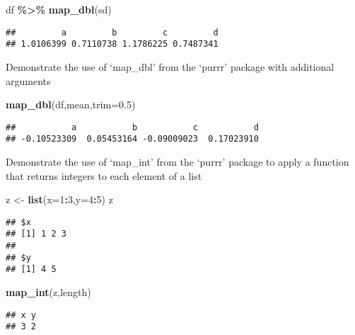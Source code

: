 \documentclass[
]{article}
\newenvironment{Shaded}{\begin{snugshade}}{\end{snugshade}}
\newcommand{\AttributeTok}[1]{\textcolor[rgb]{0.13,0.29,0.53}{#1}}
\newcommand{\DecValTok}[1]{\textcolor[rgb]{0.00,0.00,0.81}{#1}}
\newcommand{\FloatTok}[1]{\textcolor[rgb]{0.00,0.00,0.81}{#1}}
\newcommand{\FunctionTok}[1]{\textcolor[rgb]{0.13,0.29,0.53}{\textbf{#1}}}
\newcommand{\NormalTok}[1]{#1}
\newcommand{\OtherTok}[1]{\textcolor[rgb]{0.56,0.35,0.01}{#1}}
\newcommand{\SpecialCharTok}[1]{\textcolor[rgb]{0.81,0.36,0.00}{\textbf{#1}}}
\begin{document}
\begin{Shaded}
\begin{Highlighting}[]
\NormalTok{df }\SpecialCharTok{\%\textgreater{}\%} \FunctionTok{map\_dbl}\NormalTok{(sd)}
\end{Highlighting}
\end{Shaded}

\begin{verbatim}
##         a         b         c         d 
## 1.0106399 0.7110738 1.1786225 0.7487341
\end{verbatim}

Demonstrate the use of `map\_dbl' from the `purrr' package with
additional arguments

\begin{Shaded}
\begin{Highlighting}[]
\FunctionTok{map\_dbl}\NormalTok{(df,mean,}\AttributeTok{trim=}\FloatTok{0.5}\NormalTok{)}
\end{Highlighting}
\end{Shaded}

\begin{verbatim}
##           a           b           c           d 
## -0.10523309  0.05453164 -0.09009023  0.17023910
\end{verbatim}

Demonstrate the use of `map\_int' from the `purrr' package to apply a
function that returns integers to each element of a list

\begin{Shaded}
\begin{Highlighting}[]
\NormalTok{z }\OtherTok{\textless{}{-}} \FunctionTok{list}\NormalTok{(}\AttributeTok{x=}\DecValTok{1}\SpecialCharTok{:}\DecValTok{3}\NormalTok{,}\AttributeTok{y=}\DecValTok{4}\SpecialCharTok{:}\DecValTok{5}\NormalTok{)}
\NormalTok{z}
\end{Highlighting}
\end{Shaded}

\begin{verbatim}
## $x
## [1] 1 2 3
## 
## $y
## [1] 4 5
\end{verbatim}

\begin{Shaded}
\begin{Highlighting}[]
\FunctionTok{map\_int}\NormalTok{(z,length)}
\end{Highlighting}
\end{Shaded}

\begin{verbatim}
## x y 
## 3 2
\end{verbatim}
\end{document}

